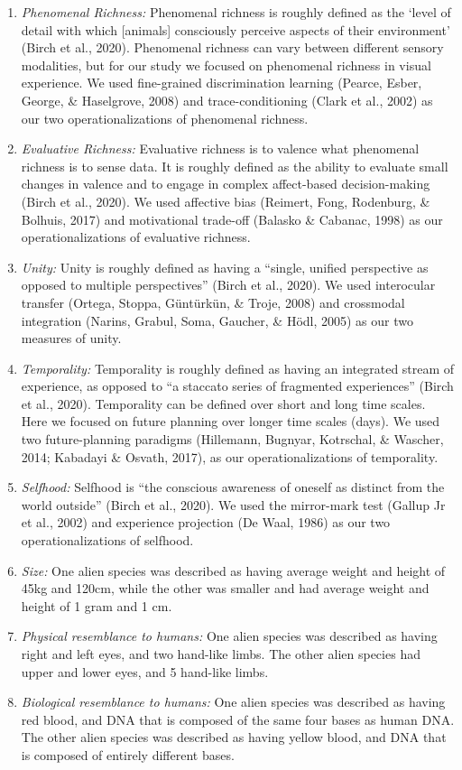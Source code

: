 \documentclass[10pt, letterpaper]{article}
\begin{document}
\begin{enumerate}
\def\labelenumi{\arabic{enumi}.}
\item
  \emph{Phenomenal Richness:} Phenomenal richness is roughly defined as
  the `level of detail with which {[}animals{]} consciously perceive
  aspects of their environment' (Birch et al., 2020). Phenomenal
  richness can vary between different sensory modalities, but for our
  study we focused on phenomenal richness in visual experience. We used
  fine-grained discrimination learning (Pearce, Esber, George, \&
  Haselgrove, 2008) and trace-conditioning (Clark et al., 2002) as our
  two operationalizations of phenomenal richness.
\item
  \emph{Evaluative Richness:} Evaluative richness is to valence what
  phenomenal richness is to sense data. It is roughly defined as the
  ability to evaluate small changes in valence and to engage in complex
  affect-based decision-making (Birch et al., 2020). We used affective
  bias (Reimert, Fong, Rodenburg, \& Bolhuis, 2017) and motivational
  trade-off (Balasko \& Cabanac, 1998) as our operationalizations of
  evaluative richness.
\item
  \emph{Unity:} Unity is roughly defined as having a ``single, unified
  perspective as opposed to multiple perspectives'' (Birch et al.,
  2020). We used interocular transfer (Ortega, Stoppa, Güntürkün, \&
  Troje, 2008) and crossmodal integration (Narins, Grabul, Soma,
  Gaucher, \& Hödl, 2005) as our two measures of unity.
\item
  \emph{Temporality:} Temporality is roughly defined as having an
  integrated stream of experience, as opposed to ``a staccato series of
  fragmented experiences'' (Birch et al., 2020). Temporality can be
  defined over short and long time scales. Here we focused on future
  planning over longer time scales (days). We used two future-planning
  paradigms (Hillemann, Bugnyar, Kotrschal, \& Wascher, 2014; Kabadayi
  \& Osvath, 2017), as our operationalizations of temporality.
\item
  \emph{Selfhood:} Selfhood is ``the conscious awareness of oneself as
  distinct from the world outside'' (Birch et al., 2020). We used the
  mirror-mark test (Gallup Jr et al., 2002) and experience projection
  (De Waal, 1986) as our two operationalizations of selfhood.
\item
  \emph{Size:} One alien species was described as having average weight
  and height of 45kg and 120cm, while the other was smaller and had
  average weight and height of 1 gram and 1 cm.
\item
  \emph{Physical resemblance to humans:} One alien species was described
  as having right and left eyes, and two hand-like limbs. The other
  alien species had upper and lower eyes, and 5 hand-like limbs.
\item
  \emph{Biological resemblance to humans:} One alien species was
  described as having red blood, and DNA that is composed of the same
  four bases as human DNA. The other alien species was described as
  having yellow blood, and DNA that is composed of entirely different
  bases.
\end{enumerate}
\end{document}
